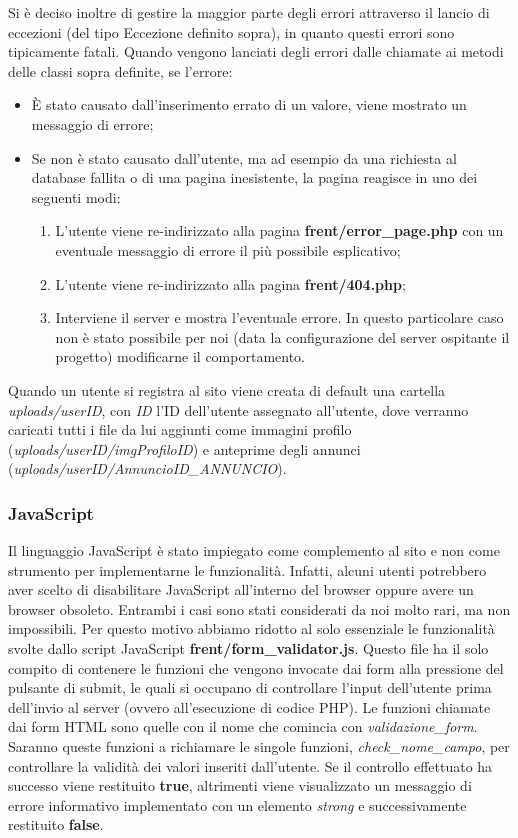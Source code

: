 \documentclass[1_relazione.tex]{subfiles}
\begin{document}
Si è deciso inoltre di gestire la maggior parte degli errori attraverso il lancio di eccezioni (del tipo Eccezione definito sopra), in quanto questi errori sono tipicamente fatali.
Quando vengono lanciati degli errori dalle chiamate ai metodi delle classi sopra definite, se l'errore:
\begin{itemize}
    \item \`{E} stato causato dall'inserimento errato di un valore, viene mostrato un messaggio di errore;
    \item Se non \`{e} stato causato dall'utente, ma ad esempio da una richiesta al database fallita o di una pagina inesistente, la pagina reagisce in uno dei seguenti modi:
    \begin{enumerate}
        \item L'utente viene re-indirizzato alla pagina \textbf{frent/error\_page.php} con un eventuale messaggio di errore il più possibile esplicativo;
        \item L'utente viene re-indirizzato alla pagina \textbf{frent/404.php};
        \item Interviene il server e mostra l'eventuale errore. In questo particolare caso non è stato possibile per noi (data la configurazione del server ospitante il progetto) modificarne il comportamento.
    \end{enumerate}
\end{itemize}
Quando un utente si registra al sito viene creata di default una cartella \textit{uploads/userID}, con \textit{ID} l'ID dell'utente assegnato all'utente, dove verranno caricati tutti i file da lui aggiunti come immagini profilo (\textit{uploads/userID/imgProfiloID}) e anteprime degli annunci (\textit{uploads/userID/AnnuncioID\_ANNUNCIO}).

\subsubsection{JavaScript}
Il linguaggio JavaScript \`{e} stato impiegato come complemento al sito e non come strumento per implementarne le funzionalità.
Infatti, alcuni utenti potrebbero aver scelto di disabilitare JavaScript all'interno del browser oppure avere un browser obsoleto. Entrambi i casi sono stati considerati da noi molto rari, ma non impossibili.
Per questo motivo abbiamo ridotto al solo essenziale le funzionalità svolte dallo script JavaScript \textbf{frent/form\_validator.js}.
Questo file ha il solo compito di contenere le funzioni che vengono invocate dai form alla pressione del pulsante di submit, le quali si occupano di controllare l'input dell'utente prima dell'invio al server (ovvero all'esecuzione di codice PHP).
Le funzioni chiamate dai form HTML sono quelle con il nome che comincia con \textit{validazione\_form}. Saranno queste funzioni a richiamare le singole funzioni, \textit{check\_nome\_campo}, per controllare la validit\`{a} dei valori inseriti dall'utente.
Se il controllo effettuato ha successo viene restituito \textbf{true}, altrimenti viene visualizzato un messaggio di errore informativo implementato con un elemento \textit{strong} e successivamente restituito \textbf{false}.
\end{document}
